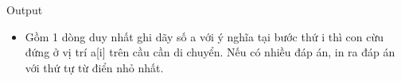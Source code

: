 Output
\begin{itemize}
	\item Gồm 1 dòng duy nhất ghi dãy số a với ý nghĩa tại bước thứ i thì con cừu đứng ở vị trí a[i] trên cầu cần di chuyển. Nếu có nhiều đáp án, in ra đáp án với thứ tự từ điển nhỏ nhất.
\end{itemize}